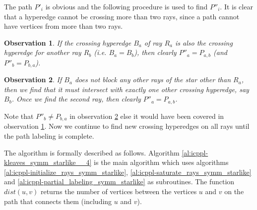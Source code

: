 \documentclass{CRPITStyle} %
\def\xnoindent{} %
\newtheorem{observation}{Observation}
\begin{document}
\xnoindent
The path $P'_i$ is obvious and the following procedure is used to find
$P''_i$. It is clear that a hyperedge cannot be crossing more than two rays,
since a path cannot have vertices from more than two rays. 

\begin{observation}
\label{obs:sameblock}
If the crossing hyperedge $B_a$ of ray $R_a$ is also the crossing
  hyperedge for another ray $R_b$ (i.e. $B_a = B_b$), then clearly
  $P''_a = P_{a,b}$ (and $P''_b = P_{b,a}$). 
\end{observation}

\begin{observation}
\label{obs:diffblock}
If $B_a$ does not block
  any other rays of the star other than $R_a$, then we find that it
  must intersect with exactly one other crossing hyperedge, say
  $B_b$. Once we find the second 
ray,  then clearly $P''_a = P_{a,b}$.
\end{observation}
\xnoindent
Note that $P''_b \ne P_{b,a}$ in
observation \ref{obs:diffblock} else it would have been covered in
observation \ref{obs:sameblock}.
Now we continue to find new crossing hyperedges on all rays until the
path labeling is complete. 

\xnoindent
The algorithm is formally described as follows. Algorithm
\ref{al:icppl-kleaves_symm_starlike__4} is the main algorithm which
uses algorithms \ref{al:icppl-initialize_rays_symm_starlike},
\ref{al:icppl-saturate_rays_symm_starlike} and
\ref{al:icppl-partial_labeling_symm_starlike} as subroutines. The
function $dist(u,v)$ returns the number of vertices between the
vertices $u$ and $v$ on the path that connects them (including $u$ and $v$).
\end{document}
